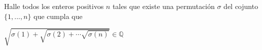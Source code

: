 \begin{problem}
	Halle todos los enteros positivos $n$ tales que existe una permutación $\sigma$ del cojunto $\{1, ..., n\}$ que cumpla que 
	
	\begin{center}
		${\displaystyle \sqrt{\sigma(1) + \sqrt{\sigma(2) + \cdots \sqrt{\sigma(n)}}}} \in \mathbb{Q}$
	\end{center}
\end{problem}